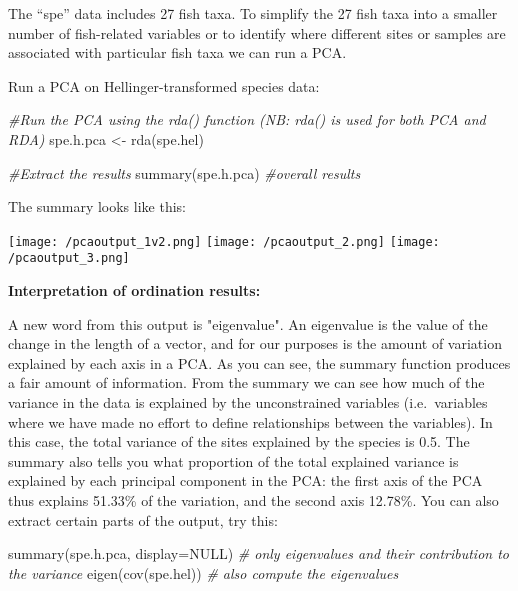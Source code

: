 \documentclass[
]{book}
\newenvironment{Shaded}{\begin{snugshade}}{\end{snugshade}}
\newcommand{\AttributeTok}[1]{\textcolor[rgb]{0.77,0.63,0.00}{#1}}
\newcommand{\CommentTok}[1]{\textcolor[rgb]{0.56,0.35,0.01}{\textit{#1}}}
\newcommand{\ConstantTok}[1]{\textcolor[rgb]{0.00,0.00,0.00}{#1}}
\newcommand{\FunctionTok}[1]{\textcolor[rgb]{0.00,0.00,0.00}{#1}}
\newcommand{\NormalTok}[1]{#1}
\newcommand{\OtherTok}[1]{\textcolor[rgb]{0.56,0.35,0.01}{#1}}
\begin{document}
The ``spe'' data includes 27 fish taxa. To simplify the 27 fish taxa into
a smaller number of fish-related variables or to identify where
different sites or samples are associated with particular fish taxa we
can run a PCA.

Run a PCA on Hellinger-transformed species data:

\begin{Shaded}
\begin{Highlighting}[]
\CommentTok{\#Run the PCA using the rda() function (NB: rda() is used for both PCA and RDA)}
\NormalTok{spe.h.pca }\OtherTok{\textless{}{-}} \FunctionTok{rda}\NormalTok{(spe.hel)}

\CommentTok{\#Extract the results}
\FunctionTok{summary}\NormalTok{(spe.h.pca) }\CommentTok{\#overall results}
\end{Highlighting}
\end{Shaded}

The summary looks like this:

\texttt{[image: /pcaoutput\_1v2.png]} \texttt{[image: /pcaoutput\_2.png]}
\texttt{[image: /pcaoutput\_3.png]}

\textbf{Interpretation of ordination results:}

A new word from this output is "eigenvalue". An eigenvalue is the
value of the change in the length of a vector, and for our purposes is
the amount of variation explained by each axis in a PCA. As you can see,
the summary function produces a fair amount of information. From the
summary we can see how much of the variance in the data is explained by
the unconstrained variables (i.e.~variables where we have made no effort
to define relationships between the variables). In this case, the total
variance of the sites explained by the species is 0.5. The summary also
tells you what proportion of the total explained variance is explained
by each principal component in the PCA: the first axis of the PCA thus
explains 51.33\% of the variation, and the second axis 12.78\%. You can
also extract certain parts of the output, try this:

\begin{Shaded}
\begin{Highlighting}[]
\FunctionTok{summary}\NormalTok{(spe.h.pca, }\AttributeTok{display=}\ConstantTok{NULL}\NormalTok{) }\CommentTok{\# only eigenvalues and their contribution to the variance}
\FunctionTok{eigen}\NormalTok{(}\FunctionTok{cov}\NormalTok{(spe.hel)) }\CommentTok{\# also compute the eigenvalues}
\end{Highlighting}
\end{Shaded}
\end{document}
